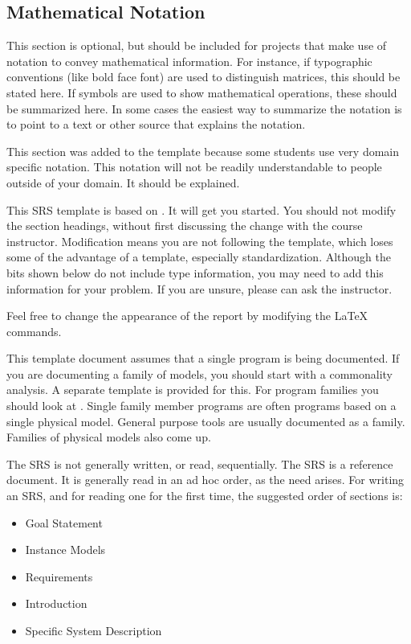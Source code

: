\documentclass[12pt]{article}
\begin{document}
\subsection{Mathematical Notation}

This section is optional, but should be included for projects that make use of
notation to convey mathematical information.  For instance, if typographic
conventions (like bold face font) are used to distinguish matrices, this should
be stated here.  If symbols are used to show mathematical operations, these
should be summarized here.  In some cases the easiest way to summarize the
notation is to point to a text or other source that explains the notation.

This section was added to the template because some students use very domain
specific notation.  This notation will not be readily understandable to people
outside of your domain.  It should be explained.

\newpage


This SRS template is based on \citet{SmithAndLai2005, SmithEtAl2007}.  It will
get you started.  You should not modify the section headings, without first
discussing the change with the course instructor.  Modification means you are
not following the template, which loses some of the advantage of a template,
especially standardization.  Although the bits shown below do not include type
information, you may need to add this information for your problem.  If you are
unsure, please can ask the instructor.

Feel free to change the appearance of the report by modifying the LaTeX
commands.

This template document assumes that a single program is being documented. If you
are documenting a family of models, you should start with a commonality
analysis.  A separate template is provided for this.  For program families you
should look at \cite{Smith2006, SmithMcCutchanAndCarette2017}. Single family
member programs are often programs based on a single physical model.  General
purpose tools are usually documented as a family.  Families of physical models
also come up.

The SRS is not generally written, or read, sequentially.  The SRS is a reference
document.  It is generally read in an ad hoc order, as the need arises.  For
writing an SRS, and for reading one for the first time, the suggested order of
sections is:

\begin{itemize}
\item Goal Statement
\item Instance Models
\item Requirements
\item Introduction
\item Specific System Description
\end{itemize}
\end{document}
